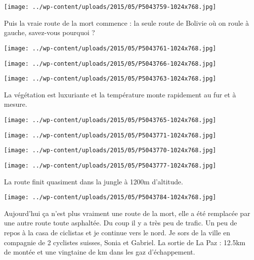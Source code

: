  \newline
\centerline{\texttt{[image: ../wp-content/uploads/2015/05/P5043759-1024x768.jpg]} } 
 \newline
 Puis la vraie route de la mort commence : la seule route de Bolivie où on roule à gauche, savez-vous pourquoi ? \newline
 \newline
\centerline{\texttt{[image: ../wp-content/uploads/2015/05/P5043761-1024x768.jpg]} } 
 \newline
 \newline
\centerline{\texttt{[image: ../wp-content/uploads/2015/05/P5043766-1024x768.jpg]} } 
 \newline
 \newline
\centerline{\texttt{[image: ../wp-content/uploads/2015/05/P5043763-1024x768.jpg]} } 
 \newline
 La végétation est luxuriante et la température monte rapidement au fur et à mesure. \newline
 \newline
\centerline{\texttt{[image: ../wp-content/uploads/2015/05/P5043765-1024x768.jpg]} } 
 \newline
 \newline
\centerline{\texttt{[image: ../wp-content/uploads/2015/05/P5043771-1024x768.jpg]} } 
 \newline
 \newline
\centerline{\texttt{[image: ../wp-content/uploads/2015/05/P5043770-1024x768.jpg]} } 
 \newline
 \newline
\centerline{\texttt{[image: ../wp-content/uploads/2015/05/P5043777-1024x768.jpg]} } 
 \newline
 La route finit quasiment dans la jungle à 1200m d'altitude. \newline
 \newline
\centerline{\texttt{[image: ../wp-content/uploads/2015/05/P5043784-1024x768.jpg]} } 
 \newline
 Aujourd'hui ça n'est plus vraiment une route de la mort, elle a été remplacée par une autre route toute asphaltée. Du coup il y a très peu de trafic. \newline
 Un peu de repos à la casa de ciclistas et je continue vers le nord. Je sors de la ville en compagnie de 2 cyclistes suisses, Sonia et Gabriel. \newline
 La sortie de La Paz : 12.5km de montée et une vingtaine de km dans les gaz d'échappement. \newline
